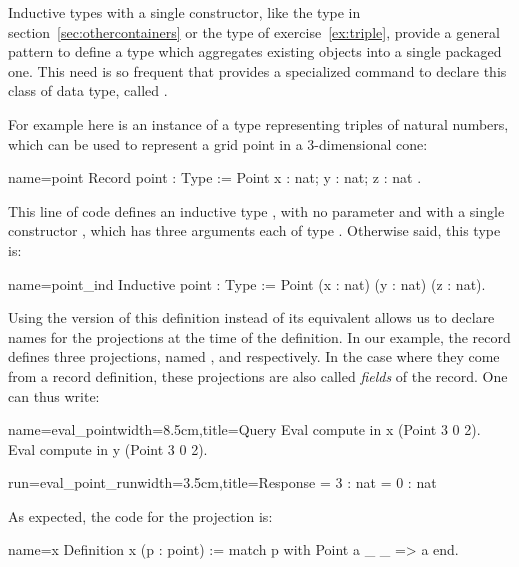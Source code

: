 Inductive types with a single constructor, like the type  in
section~\ref{sec:othercontainers} or the type  of
exercise~\ref{ex:triple}, provide a general pattern to define a type
which aggregates existing objects into a single packaged one. This
need is so frequent that \Coq{} provides a specialized command
to declare this class of data type, called .

For example here is an instance of a type representing triples of
natural numbers, which can be used to represent a grid point in a
3-dimensional cone:

\begin{coq}{name=point}{}
Record point : Type := Point { x : nat; y : nat; z : nat }.
\end{coq}
This line of code defines an inductive type , with no
parameter and with a single constructor , which has three
arguments each of type . Otherwise said, this type is:

\begin{coq}{name=point_ind}{}
Inductive point : Type := Point (x : nat) (y : nat) (z : nat).
\end{coq}

Using the  version of this definition instead of its
equivalent  allows us to declare names for the projections
at the time of the definition. In our example, the record 
defines three projections, named ,  and 
respectively. In the case where they come from a record definition,
these projections are also called \emph{fields} of the record.
One can thus write:

\begin{coq}{name=eval_point}{width=8.5cm,title=Query}
Eval compute in x (Point 3 0 2).
Eval compute in y (Point 3 0 2).
\end{coq}{}{}
\begin{coqout}{run=eval_point_run}{width=3.5cm,title=Response}
= 3 : nat
= 0 : nat
\end{coqout}{}{}

As expected, the code for the  projection is:

\begin{coq}{name=x}{}
Definition x (p : point) := match p with Point a _ _ => a end.
\end{coq}

